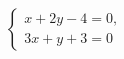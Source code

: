 \begin{ex}
	\begin{condition}
		\( \left\{
		\begin{array}{l}
			x+2y-4=0,\\
			3x+y+3=0
		\end{array}
		\right. \)
	\end{condition}
\end{ex}